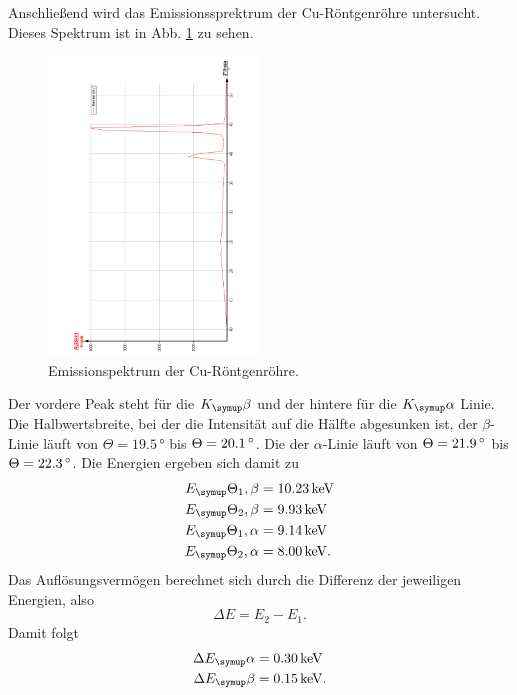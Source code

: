 Anschließend wird das Emissionssprektrum der Cu-Röntgenröhre untersucht.
Dieses Spektrum ist in Abb. \ref{fig:EmissionCu} zu sehen.
\begin{figure}[h]
  \centering
  \includegraphics[width=0.5\textwidth, angle=270]{bilder/EmissionCu.pdf}
  \caption{Emissionspektrum der Cu-Röntgenröhre.}
  \label{fig:EmissionCu}
\end{figure}
Der vordere Peak steht für die $K_\su{\beta}$ und der hintere für die $K_\su{\alpha}$
Linie. Die Halbwertsbreite, bei der die Intensität auf die Hälfte abgesunken ist,
der $\beta$-Linie läuft von $\Theta = 19.5\,\si{\degree}$ bis $\Theta = 20.1\,\si{\degree}$.
Die der $\alpha$-Linie läuft von $\Theta = 21.9\,\si{\degree}$ bis $\Theta = 22.3\,\si{\degree}$.
Die Energien ergeben sich damit zu
\begin{align}
  E_\su{\Theta_1, \beta} &= 10.23 \keV \\
  E_\su{\Theta_2, \beta} &= 9.93 \keV \\
  E_\su{\Theta_1, \alpha} &= 9.14 \keV \\
  E_\su{\Theta_2, \alpha} &= 8.00 \keV. \\
\end{align}
Das Auflösungsvermögen berechnet sich durch die Differenz der jeweiligen Energien,
also
\begin{equation}
  \Delta E = E_2 - E_1.
\end{equation}
Damit folgt
\begin{align}
  \Delta E_\su{\alpha} &= 0.30 \keV  \\
  \Delta E_\su{\beta} &= 0.15 \keV. \\
\end{align}

